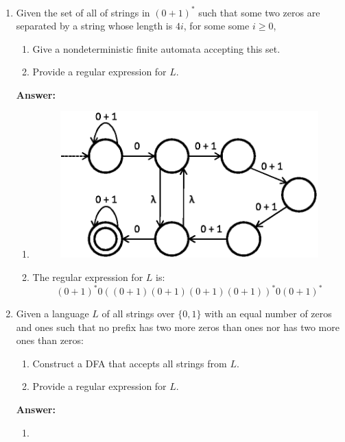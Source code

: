 \documentclass{article}%
\begin{document}
\begin{enumerate}

	\item Given the set of all of strings in $(0+1)^*$ such that some two zeros are separated by a string whose length is $4i$, for some some $i \geq 0$,
		\begin{enumerate}
		\item Give a nondeterministic finite automata accepting this set.
		\item Provide a regular expression for $L$.
	\end{enumerate}
	
\textbf{Answer:}
\begin{enumerate}
	\item 
		\begin{figure}[h]
\centering
\includegraphics[scale=0.8,clip]{nfa.eps} 
\end{figure}
	\item The regular expression for $L$ is: $$(0+1)^*0((0+1)(0+1)(0+1)(0+1))^*0(0+1)^*$$ 
	
\end{enumerate}


	\item Given a language $L$ of all strings over $\{0,1\}$ with an equal number of zeros and ones such that no prefix has two more zeros than ones nor has two more ones than zeros:	
	\begin{enumerate}
		\item  Construct a DFA that accepts all strings from $L$.
		\item  Provide a regular expression for $L$.
	\end{enumerate}

\textbf{Answer:}
\begin{enumerate}
	\item 
	

\end{enumerate}
\end{enumerate}
\end{document}
